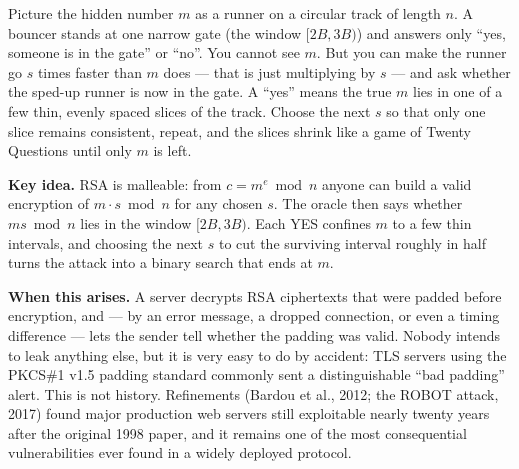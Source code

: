 \documentclass[11pt]{article}
\begin{document}
\begin{intuition}
Picture the hidden number $m$ as a runner on a circular track of length $n$. A bouncer stands at one narrow gate (the window $[2B,3B)$) and answers only ``yes, someone is in the gate'' or ``no''. You cannot see $m$. But you can make the runner go $s$ times faster than $m$ does --- that is just multiplying by $s$ --- and ask whether the sped-up runner is now in the gate. A ``yes'' means the true $m$ lies in one of a few thin, evenly spaced slices of the track. Choose the next $s$ so that only one slice remains consistent, repeat, and the slices shrink like a game of Twenty Questions until only $m$ is left.
\end{intuition}

\textbf{Key idea.} RSA is malleable: from $c=m^e\bmod n$ anyone can build a valid encryption of $m\cdot s\bmod n$ for any chosen $s$. The oracle then says whether $ms\bmod n$ lies in the window $[2B,3B)$. Each YES confines $m$ to a few thin intervals, and choosing the next $s$ to cut the surviving interval roughly in half turns the attack into a binary search that ends at $m$.

\textbf{When this arises.} A server decrypts RSA ciphertexts that were padded before encryption, and --- by an error message, a dropped connection, or even a timing difference --- lets the sender tell whether the padding was valid. Nobody intends to leak anything else, but it is very easy to do by accident: TLS servers using the PKCS\#1 v1.5 padding standard commonly sent a distinguishable ``bad padding'' alert. This is not history. Refinements (Bardou et al., 2012; the ROBOT attack, 2017) found major production web servers still exploitable nearly twenty years after the original 1998 paper, and it remains one of the most consequential vulnerabilities ever found in a widely deployed protocol.
\end{document}
